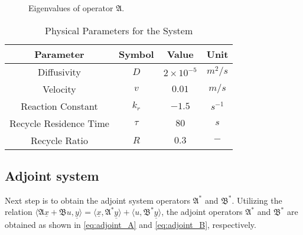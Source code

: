 \begin{figure}[!htbp]
    \centering
    
    \caption{Eigenvalues of operator $\mathfrak{A}$.}
    \label{fig:eigval_dist}
\end{figure}


\begin{table}[ht]
    \centering
    \caption{Physical Parameters for the System}
    \label{tab:pars}
    \begin{tabular}{|c|c|c|c|}
    \hline
    \textbf{Parameter}        & \textbf{Symbol} & \textbf{Value}     & \textbf{Unit}    \\ \hline
    Diffusivity               & $D$             & $2\times10^{-5}$   & ${m^2}/{s}$      \\ \hline
    Velocity                  & $v$             & $0.01$   & ${m}/{s}$        \\ \hline
    Reaction Constant         & $k_r$           & $-1.5$             & $s^{-1}$         \\ \hline
    Recycle Residence Time    & $\tau$          & $80$               & $s$              \\ \hline
    Recycle Ratio             & $R$             & $0.3$              & $-$              \\ \hline
    \end{tabular}
\end{table}

\subsection{Adjoint system}

Next step is to obtain the adjoint system operators $\mathfrak{A}^*$ and $\mathfrak{B}^*$. Utilizing the relation $\langle \mathfrak{A} \underline{x} + \mathfrak{B} u, \underline{y}\rangle = \langle \underline{x}, \mathfrak{A}^* \underline{y}\rangle + \langle u, \mathfrak{B}^* \underline{y}\rangle$, the adjoint operators $\mathfrak{A}^*$ and $\mathfrak{B}^*$ are obtained as shown in \eqref{eq:adjoint_A} and \eqref{eq:adjoint_B}, respectively.


